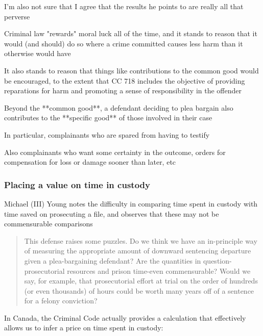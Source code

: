 I'm also not sure that I agree that the results he points to are really all that perverse

Criminal law "rewards" moral luck all of the time, and it stands to reason that it would (and should) do so where a crime committed causes less harm than it otherwise would have

It also stands to reason that things like contributions to the common good would be encouraged, to the extent that CC 718 includes the objective of providing reparations for harm and promoting a sense of responsibility in the offender

Beyond the **common good**, a defendant deciding to plea bargain also contributes to the **specific good** of those involved in their case

In particular, complainants who are spared from having to testify

Also complainants who want some certainty in the outcome, orders for compensation for loss or damage sooner than later, etc

\subsubsection{Placing a value on time in custody}

Michael (III) Young notes the difficulty in comparing time spent in custody with time saved on prosecuting a file, and observes that these may not be commensurable comparisons

\begin{quote}
    This defense raises some puzzles. Do we think we have an in-principle way of measuring the appropriate amount of downward sentencing departure given a plea-bargaining defendant? Are the quantities in question-prosecutorial resources and prison time-even commensurable? Would we say, for example, that prosecutorial effort at trial on the order of hundreds (or even thousands) of hours could be worth many years off of a sentence for a felony conviction?
\end{quote}

In Canada, the Criminal Code actually provides a calculation that effectively allows us to infer a price on time spent in custody:

